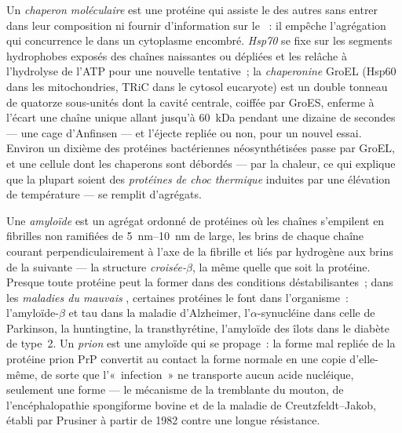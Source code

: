 \begin{definition}\label{def:b3:structural-biology:chaperones}
Un \emph{chaperon moléculaire} est une protéine qui assiste le
 des autres sans entrer dans leur composition ni fournir
d'information sur le ~: il empêche l'agrégation qui concurrence
le  dans un cytoplasme encombré. \emph{Hsp70} se fixe sur les
segments hydrophobes exposés des chaînes naissantes ou dépliées et les
relâche à l'hydrolyse de l'ATP pour une nouvelle tentative~; la
\emph{chaperonine} GroEL (Hsp60 dans les mitochondries, TRiC dans le
cytosol eucaryote) est un double tonneau de quatorze sous-unités dont
la cavité centrale, coiffée par GroES, enferme à l'écart une chaîne
unique allant jusqu'à \qty{60}{kDa} pendant une dizaine de secondes ---
une cage d'Anfinsen --- et l'éjecte repliée ou non, pour un nouvel
essai. Environ un dixième des protéines bactériennes néosynthétisées
passe par GroEL, et une cellule dont les chaperons sont débordés ---
par la chaleur, ce qui explique que la plupart soient des
\emph{protéines de choc thermique} induites par une élévation de
température --- se remplit d'agrégats.
\end{definition}

\begin{definition}[L'amyloïde]\label{def:b3:structural-biology:amyloid}
Une \emph{amyloïde} est un agrégat ordonné de protéines où les chaînes
s'empilent en fibrilles non ramifiées de \qtyrange{5}{10}{nm} de large,
les brins de chaque chaîne courant perpendiculairement à l'axe de la
fibrille et liés par hydrogène aux brins de la suivante --- la
structure \emph{croisée-$\beta$}, la même quelle que soit la protéine.
Presque toute protéine peut la former dans des conditions
déstabilisantes~; dans les \emph{maladies du mauvais },
certaines protéines le font dans l'organisme~: l'amyloïde-$\beta$ et
tau dans la maladie d'Alzheimer, l'$\alpha$-synucléine dans celle de
Parkinson, la huntingtine, la transthyrétine, l'amyloïde des îlots dans
le diabète de type~2. Un \emph{prion} est une amyloïde qui se
propage~: la forme mal repliée de la protéine prion PrP convertit au
contact la forme normale en une copie d'elle-même, de sorte que
l'«~infection~» ne transporte aucun acide nucléique, seulement une
forme --- le mécanisme de la tremblante du mouton, de
l'encéphalopathie spongiforme bovine et de la maladie de
Creutzfeldt--Jakob, établi par Prusiner à partir de 1982 contre une
longue résistance.
\end{definition}

